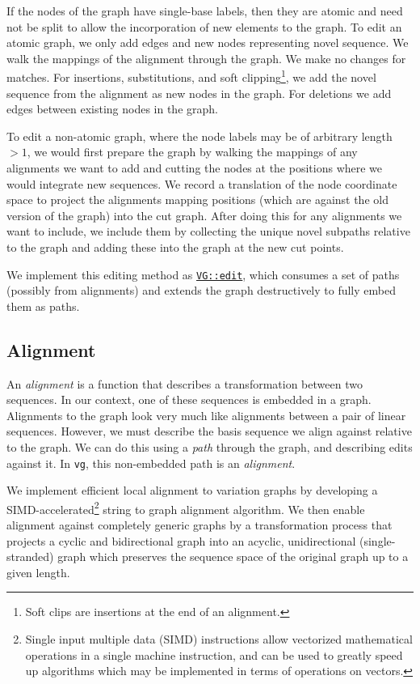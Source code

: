 \documentclass{article}
\begin{document}
If the nodes of the graph have single-base labels, then they are atomic and need not be split to allow the incorporation of new elements to the graph.
To edit an atomic graph, we only add edges and new nodes representing novel sequence.
We walk the mappings of the alignment through the graph.
We make no changes for matches.
For insertions, substitutions, and soft clipping\footnote{Soft clips are insertions at the end of an alignment.}, we add the novel sequence from the alignment as new nodes in the graph.
For deletions we add edges between existing nodes in the graph.

To edit a non-atomic graph, where the node labels may be of arbitrary length $> 1$, we would first prepare the graph by walking the mappings of any alignments we want to add and cutting the nodes at the positions where we would integrate new sequences.
We record a translation of the node coordinate space to project the alignments mapping positions (which are against the old version of the graph) into the cut graph.
After doing this for any alignments we want to include, we include them by collecting the unique novel subpaths relative to the graph and adding these into the graph at the new cut points.

We implement this editing method as \href{https://github.com/vgteam/vg/blob/fbcb6e62/src/vg.cpp#L4846-L4912}{{\tt VG::edit}}, which consumes a set of paths (possibly from alignments) and extends the graph destructively to fully embed them as paths.

\subsection{Alignment}

An \emph{alignment} is a function that describes a transformation between two sequences.
In our context, one of these sequences is embedded in a graph.
Alignments to the graph look very much like alignments between a pair of linear sequences.
However, we must describe the basis sequence we align against relative to the graph.
We can do this using a \emph{path} through the graph, and describing edits against it.
In {\tt vg}, this non-embedded path is an \emph{alignment}.

We implement efficient local alignment to variation graphs by developing a SIMD-accelerated\footnote{Single input multiple data (SIMD) instructions allow vectorized mathematical operations in a single machine instruction, and can be used to greatly speed up algorithms which may be implemented in terms of operations on vectors.} string to graph alignment algorithm. We then enable alignment against completely generic graphs by a transformation process that projects a cyclic and bidirectional graph into an acyclic, unidirectional (single-stranded) graph which preserves the sequence space of the original graph up to a given length.
\end{document}
